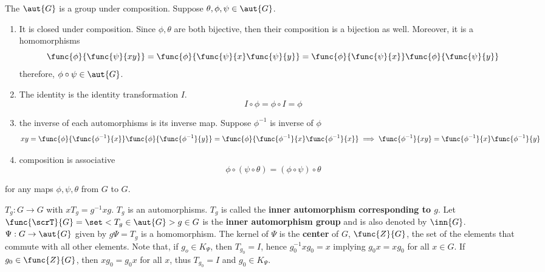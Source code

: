 \begin{prooflemma}
    The \(\aut{G}\) is a group under composition. Suppose \(\theta,\phi, \psi \in \aut{G}\).
    \begin{enumerate}
        \item It is closed under composition. Since \(\phi, \theta\) are both bijective, then their composition is a bijection as well. Moreover, it is a homomorphisms
        \begin{equation*}
            \func{\phi}{\func{\psi}{xy}} = \func{\phi}{\func{\psi}{x} \func{\psi}{y}} = \func{\phi}{\func{\psi}{x}}\func{\phi}{\func{\psi}{y}}
        \end{equation*}
        therefore, \(\phi \circ \psi \in \aut{G}\).
        \item The identity is the identity transformation \(I\).
        \begin{equation*}
            I \circ \phi = \phi \circ I = \phi
        \end{equation*}
        \item the inverse of each automorphisms is its inverse map. Suppose \(\phi^{-1}\) is inverse of \(\phi\) 
        \begin{equation*}
            xy = \func{\phi}{\func{\phi^{-1}}{x}} \func{\phi}{ \func{\phi^{-1}}{y} } = \func{\phi}{\func{\phi^{-1}}{x} \func{\phi^{-1}}{x}} \implies \func{\phi^{-1}}{xy} = \func{\phi^{-1}}{x} \func{\phi^{-1}}{y} 
        \end{equation*}
        \item composition is associative 
        \begin{equation*}
            \phi \circ (\psi \circ \theta) = (\phi \circ \psi) \circ \theta
        \end{equation*}
    \end{enumerate} 
    for any maps \(\phi,\psi, \theta \) from \(G\) to \(G\).
\end{prooflemma}

\begin{example}
\(T_g:G \to G\) with \(xT_g = g^{-1}xg\). \(T_g\) is an automorphisms. \(T_g\) is called the \textbf{inner automorphism corresponding to \(g\)}. Let \(\func{\scrT}{G} = \set<T_g \in \aut{G}>{g \in G}\) is the \textbf{inner automorphism group} and is also denoted by \(\inn{G}\). \(\Psi: G \to \aut{G}\) given by \(g\Psi = T_g\) is a homomorphism. The kernel of \(\Psi\) is the \textbf{center} of \(G\), \(\func{Z}{G}\), the set of the elements that commute with all other elements. Note that, if \(g_o \in K_{\Psi}\), then \(T_{g_0} = I\), hence \(g_0^{-1}xg_0 = x\) implying \(g_0x = xg_0\) for all \(x \in G\). If \(g_0 \in \func{Z}{G}\), then \(xg_0 = g_0x\) for all \(x\), thus \(T_{g_0} = I\) and \(g_0 \in K_{\Psi}\).
\end{example}

